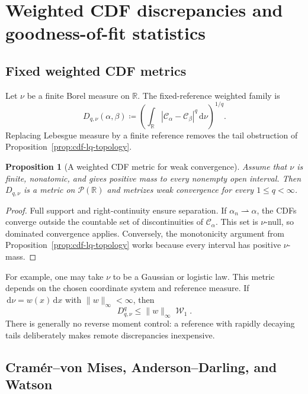 \documentclass[11pt]{article}
\newtheorem{proposition}[theorem]{Proposition}
\newcommand{\RR}{\mathbb R}
\newcommand{\Pp}{\mathcal P}
\renewcommand{\d}{\,\mathrm d}
\newcommand{\al}{\alpha}
\newcommand{\be}{\beta}
\newcommand{\Cc}{\mathcal C}
\newcommand{\cumul}[1]{\Cc_{#1}}
\DeclareMathOperator{\Wass}{\mathcal W}
\newcommand{\eqdef}{\coloneqq}
\begin{document}
\section{Weighted CDF discrepancies and goodness-of-fit statistics}

\subsection{Fixed weighted CDF metrics}

Let $\nu$ be a finite Borel measure on $\RR$.  The fixed-reference weighted
family is
\begin{equation}\label{eq:fixed-weighted-cdf}
 D_{q,\nu}(\al,\be)
 \eqdef\left(\int_\RR |\cumul{\al}-\cumul{\be}|^q\d\nu\right)^{1/q}.
\end{equation}
Replacing Lebesgue measure by a finite reference removes the tail obstruction
of Proposition~\ref{prop:cdf-lq-topology}.

\begin{proposition}[A weighted CDF metric for weak convergence]
\label{prop:weighted-cdf-weak}
Assume that $\nu$ is finite, nonatomic, and gives positive mass to every
nonempty open interval.  Then $D_{q,\nu}$ is a metric on $\Pp(\RR)$ and
metrizes weak convergence for every $1\leq q<\infty$.
\end{proposition}

\begin{proof}
Full support and right-continuity ensure separation.  If
$\al_n\rightharpoonup\al$, the CDFs converge outside the countable set of
discontinuities of $\cumul{\al}$.  This set is $\nu$-null, so dominated
convergence applies.  Conversely, the monotonicity argument from
Proposition~\ref{prop:cdf-lq-topology} works because every interval has
positive $\nu$-mass.
\end{proof}

For example, one may take $\nu$ to be a Gaussian or logistic law.  This metric
depends on the chosen coordinate system and reference measure.  If
$\d\nu=w(x)\d x$ with $\|w\|_\infty<\infty$, then
\begin{equation}\label{eq:weighted-cdf-w1}
 D_{q,\nu}^q\leq\|w\|_\infty\Wass_1.
\end{equation}
There is generally no reverse moment control: a reference with rapidly
decaying tails deliberately makes remote discrepancies inexpensive.

\subsection{Cram\'er--von Mises, Anderson--Darling, and Watson}
\end{document}

